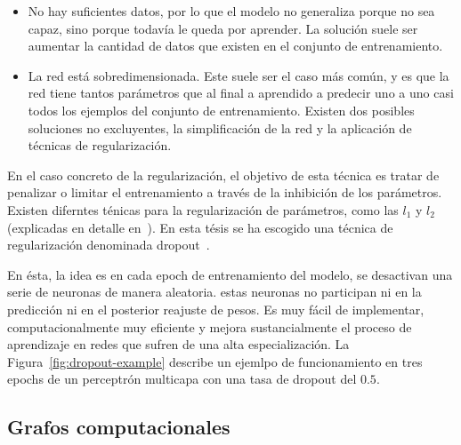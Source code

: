 \begin{itemize}
	\item No hay suficientes datos, por lo que el modelo no generaliza porque no sea capaz, sino porque todavía le queda por aprender. La solución suele ser aumentar la cantidad de datos que existen en el conjunto de entrenamiento.
	\item La red está sobredimensionada. Este suele ser el caso más común, y es que la red tiene tantos parámetros que al final a aprendido a predecir uno a uno casi todos los ejemplos del conjunto de entrenamiento. Existen dos posibles soluciones no excluyentes, la simplificación de la red y la aplicación de técnicas de regularización.
\end{itemize}

En el caso concreto de la regularización, el objetivo de esta técnica es tratar de penalizar o limitar el entrenamiento a través de la inhibición de los parámetros. Existen diferntes ténicas para la regularización de parámetros, como las $l_1$ y $l_2$ (explicadas en detalle en~\cite{ng2004feature}). En esta tésis se ha escogido una técnica de regularización denominada dropout~\cite{srivastava2014dropout}.

\begin{figure*}
	\centering
	\qquad
	\qquad
	\caption[Ejemplo de la operación de dropout en tres epochs sucesivos.]{Ejemplo del funcionamiento del dropout en tres epochs sucesivos. Suponiendo una tasa de dropout de $0.5$, en cada epoch cada neurona tiene una probabilidad del $50\%$ de ser desactivada, y por tanto el error no se propagará hacia sus pesos de entrada.}
	\label{fig:dropout-example}
\end{figure*}

En ésta, la idea es en cada epoch de entrenamiento del modelo, se desactivan una serie de neuronas de manera aleatoria. estas neuronas no participan ni en la predicción ni en el posterior reajuste de pesos. Es muy fácil de implementar, computacionalmente muy eficiente y mejora sustancialmente el proceso de aprendizaje en redes que sufren de una alta especialización. La Figura~\ref{fig:dropout-example} describe un ejemlpo de funcionamiento en tres epochs de un perceptrón multicapa con una tasa de dropout del $0.5$.

\subsection{Grafos computacionales}

